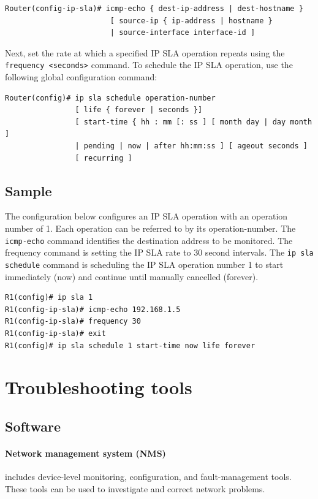 \begin{verbatim}
Router(config-ip-sla)# icmp-echo { dest-ip-address | dest-hostname } 
						[ source-ip { ip-address | hostname } 
						| source-interface interface-id ] 
\end{verbatim}

Next, set the rate at which a specified IP SLA operation repeats using the \verb|frequency <seconds>| command. To schedule the IP SLA operation, use the following global configuration command:

\begin{verbatim}
Router(config)# ip sla schedule operation-number 
                [ life { forever | seconds }] 
                [ start-time { hh : mm [: ss ] [ month day | day month ] 
                | pending | now | after hh:mm:ss ] [ ageout seconds ] 
                [ recurring ] 
\end{verbatim}

\subsection{Sample}

The configuration below configures an IP SLA operation with an operation number of 1.  Each operation can be referred to by its operation-number. The \verb|icmp-echo| command identifies the destination address to be monitored. The frequency command is setting the IP SLA rate to 30 second intervals. The \verb|ip sla schedule| command is scheduling the IP SLA operation number 1 to start immediately (now) and continue until manually cancelled (forever).

\begin{verbatim}
R1(config)# ip sla 1
R1(config-ip-sla)# icmp-echo 192.168.1.5
R1(config-ip-sla)# frequency 30
R1(config-ip-sla)# exit
R1(config)# ip sla schedule 1 start-time now life forever
\end{verbatim}

\section{Troubleshooting tools}

\subsection{Software}

\paragraph{Network management system (NMS)}includes device-level monitoring, configuration, and fault-management tools.  These tools can be used to investigate and correct network problems.

